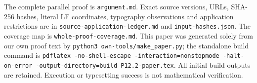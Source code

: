 \documentclass[11pt]{article}
\begin{document}
The complete parallel proof is \texttt{argument.md}. Exact source versions,
URLs, SHA-256 hashes, literal LF coordinates, typography observations and
application restrictions are in \texttt{source-application-ledger.md} and
\texttt{input-hashes.json}. The coverage map is \texttt{whole-proof-coverage.md}.
This paper was generated solely from our own proof text by
\texttt{python3 own-tools/make\_paper.py}; the standalone build command is
\texttt{pdflatex -no-shell-escape -interaction=nonstopmode -halt-on-error
-output-directory=build P12.2-paper.tex}. All initial build outputs are
retained. Execution or typesetting success is not mathematical verification.
\end{document}
